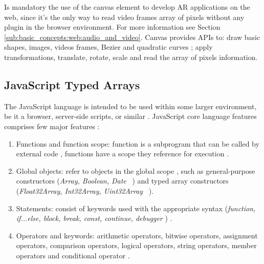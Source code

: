 Is mandatory the use of the canvas element \cite{Canvas2013} to develop AR applications on the web, since it's the only way to read video frames array of pixels without any plugin in the browser environment. For more information see Section \ref{sub:basic_concepts:web:audio_and_video}. Canvas provides APIs to: draw basic shapes, images, videos frames, Bezier \cite{piegl1993fundamental} and quadratic curves \cite{piegl1993fundamental,Hartley2004}; apply transformations, translate, rotate, scale and read the array of pixels information.


\subsection{JavaScript Typed Arrays} %
\label{sub:basic_concepts:web:javascript_typed_arrays}

The JavaScript language \cite{International2009} is intended to be used within some larger environment, be it a browser, server-side scripts, or similar \cite{Grosskurth2005}. JavaScript \cite{International2009} core language features comprises few major features \cite{MDN2013}:

\begin{enumerate}
\item Functions and function scope: function is a subprogram that can be called by external code \cite{MDN2013}, functions have a scope they reference for execution \cite{MDN2013}.
\item Global objects: refer to objects in the global scope \cite{MDN2013}, such as general-purpose constructors (\textit{Array, Boolean, Date} \etc\ \cite{MDN2013}) and typed array constructors (\textit{Float32Array, Int32Array, Uint32Array} \etc\ \cite{MDN2013}).
\item Statements: consist of keywords used with the appropriate syntax (\textit{function, if...else, block, break, const, continue, debugger \etc}) \cite{MDN2013}.
\item Operators and keywords: arithmetic operators, bitwise operators, assignment operators, comparison operators, logical operators, string operators, member operators and conditional operator \cite{MDN2013}.
\end{enumerate}

